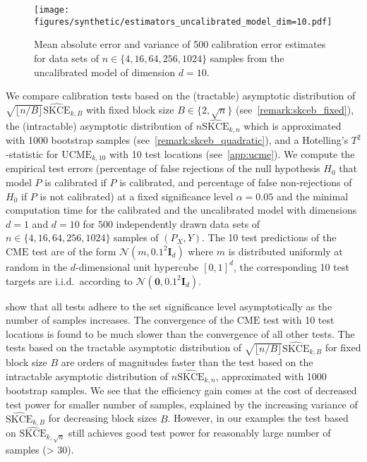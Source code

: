 \documentclass{article}
\begin{document}
\begin{figure}[hpt]
    \begin{center}
        \texttt{[image: figures/synthetic/estimators\_uncalibrated\_model\_dim=10.pdf]}
        \caption{Mean absolute error and variance of 500 calibration error estimates for
        data sets of $n \in \{4, 16, 64, 256, 1024\}$ samples from the uncalibrated model
        of dimension $d = 10$.}
        \label{fig:synthetic_estimators_uncalibrated_10}
    \end{center}
\end{figure}

We compare calibration tests based on the (tractable) asymptotic distribution of
$\sqrt{\lfloor n / B \rfloor} \widehat{\mathrm{SKCE}}_{k,B}$ with fixed block
size $B \in \{2, \sqrt{n}\}$
(see~\cref{remark:skceb_fixed}), the (intractable) asymptotic distribution of
$n\widehat{\mathrm{SKCE}}_{k,n}$ which is approximated with 1000 bootstrap
samples (see~\cref{remark:skceb_quadratic}), and a Hotelling's $T^2$-statistic for
$\mathrm{UCME}_{k,10}$ with 10 test locations (see~\cref{app:ucme}). We compute
the empirical test errors (percentage of false rejections of the null hypothesis $H_0$
that model $P$ is calibrated if $P$ is calibrated, and percentage of false non-rejections
of $H_0$ if $P$ is not calibrated) at a fixed significance level $\alpha = 0.05$ and
the minimal computation time for the calibrated and the uncalibrated model with
dimensions $d = 1$ and $d = 10$ for $500$ independently drawn data sets of
$n \in \{4, 16, 64, 256, 1024\}$ samples of $(P_X, Y)$. The 10 test
predictions of the $\mathrm{CME}$ test are of the form $\mathcal{N}(m, 0.1^2 \mathbf{I}_d)$
where $m$ is distributed uniformly at random in the $d$-dimensional unit hypercube $[0,1]^d$,
the corresponding 10 test targets are i.i.d.\ according to
$\mathcal{N}(\mathbf{0}, 0.1^2 \mathbf{I}_d)$.

 show that all tests adhere to the set
significance level asymptotically as the number of samples increases. The convergence of
the $\mathrm{CME}$ test with 10 test locations is found to be much slower than the convergence
of all other tests.
The tests based on the tractable asymptotic distribution of
$\sqrt{\lfloor n / B \rfloor} \widehat{\mathrm{SKCE}}_{k,B}$ for
fixed block size $B$ are orders of magnitudes faster than the test based on the intractable
asymptotic distribution of $n \widehat{\mathrm{SKCE}}_{k,n}$, approximated with 1000 bootstrap
samples. We see that the efficiency gain comes at the cost of decreased test power for smaller
number of samples, explained by the increasing variance of $\widehat{\mathrm{SKCE}}_{k,B}$ for
decreasing block sizes $B$.
However, in our examples the test based on $\widehat{\mathrm{SKCE}}_{k,\sqrt{n}}$
still achieves good test power for reasonably large number of samples (> 30).
\end{document}
